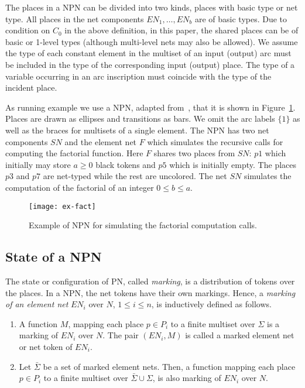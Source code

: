 \documentclass{llncs}
\begin{document}
The places in a NPN can be divided into two kinds, places with basic type or net type. All places in the net components $EN_1,\ldots,EN_b$ are of basic types. Due to condition on $C_0$ in the above definition, in this paper, the shared places can be of basic or 1-level types (although multi-level nets may also be allowed). We assume the type of each constant element in the multiset of an input (output) arc must be included in the type of the corresponding input (output) place. The type of a variable occurring in an arc inscription must coincide with the type of the incident place.




\begin{example}
\label{ex:npn-fact}
As running example we use a NPN, adapted from~\cite{Lomazova01}, that it is shown in Figure~\ref{figRPNFact}. Places are drawn as ellipses and transitions as bars. We omit the arc labels $\{1\}$ as well as the braces for multisets of a single element. The NPN has two net components $SN$ and the element net $F$ which simulates the recursive calls for computing the factorial function. Here $F$ shares two places from $SN$: $p1$ which initially may store $a\geq 0$ black tokens and $p5$ which is initially empty. The places $p3$ and $p7$ are net-typed while the rest are uncolored. The net $SN$ simulates the computation of the factorial of an integer $0\leq b\leq a$.

\vspace{-10pt}
\begin{figure}
\begin{center}
\texttt{[image: ex-fact]}
\end{center}
\vspace{-10pt}
\caption{Example of NPN for simulating the factorial computation calls.}
\label{figRPNFact}
\end{figure}
\end{example}


\subsection{State of a NPN}

The state or configuration of PN, called \emph{marking}, is a distribution of tokens over the places. In a NPN, the net tokens have their own markings. Hence, a \emph{marking of an element net} $EN_i$ over $N$, $1\leq i \leq n$, is inductively defined as follows.
\begin{enumerate}
    \item A function $M$, mapping each place $p\in P_i$ to a finite multiset over $\Sigma$ is a marking of $EN_i$ over $N$. The pair $(EN_i, M)$ is called a marked element net or net token of $EN_i$.
    \item Let $\bar{\Sigma}$ be a set of marked element nets. Then, a function mapping each place $p\in P_i$ to a finite multiset over $\bar{\Sigma}\cup \Sigma$, is also marking of $EN_i$ over $N$.
\end{enumerate}
\end{document}

